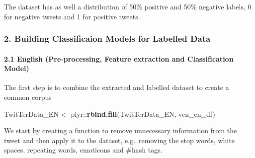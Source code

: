 \documentclass[]{article}
\newenvironment{Shaded}{\begin{snugshade}}{\end{snugshade}}
\newcommand{\KeywordTok}[1]{\textcolor[rgb]{0.13,0.29,0.53}{\textbf{{#1}}}}
\newcommand{\StringTok}[1]{\textcolor[rgb]{0.31,0.60,0.02}{{#1}}}
\newcommand{\CommentTok}[1]{\textcolor[rgb]{0.56,0.35,0.01}{\textit{{#1}}}}
\newcommand{\NormalTok}[1]{{#1}}
\let\oldparagraph\paragraph
\renewcommand{\paragraph}[1]{\oldparagraph{#1}\mbox{}}
\begin{document}
\begin{Shaded}
\end{Shaded}

The dataset has as well a distribution of 50\% positive and 50\%
negative labels, 0 for negative tweets and 1 for positive tweets.

\subsubsection{2. Building Classificaion Models for Labelled
Data}\label{building-classificaion-models-for-labelled-data}

\paragraph{2.1 English (Pre-processing, Feature extraction and
Classification
Model)}\label{english-pre-processing-feature-extraction-and-classification-model}

The first step is to combine the extracted and labelled dataset to
create a common corpus

\begin{Shaded}
\begin{Highlighting}[]
\NormalTok{TwitTerData_EN <-}\StringTok{ }\NormalTok{plyr::}\KeywordTok{rbind.fill}\NormalTok{(TwitTerData_EN, ven_en_df)}
\end{Highlighting}
\end{Shaded}

We start by creating a function to remove unnecessary information from
the tweet and then apply it to the dataset, e.g.~removing the stop
words, white spaces, repeating words, emoticons and \#hash tags.
\end{document}
